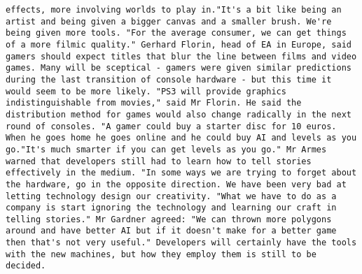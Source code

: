 \documentclass[11pt]{article}
\begin{document}
\begin{Verbatim}[commandchars=\\\{\}]
effects, more involving worlds to play in."It's a bit like being an artist and being given a bigger canvas and a smaller brush. We're being given more tools. "For the average consumer, we can get things of a more filmic quality." Gerhard Florin, head of EA in Europe, said gamers should expect titles that blur the line between films and video games. Many will be sceptical - gamers were given similar predictions during the last transition of console hardware - but this time it would seem to be more likely. "PS3 will provide graphics indistinguishable from movies," said Mr Florin. He said the distribution method for games would also change radically in the next round of consoles. "A gamer could buy a starter disc for 10 euros. When he goes home he goes online and he could buy AI and levels as you go."It's much smarter if you can get levels as you go." Mr Armes warned that developers still had to learn how to tell stories effectively in the medium. "In some ways we are trying to forget about the hardware, go in the opposite direction. We have been very bad at letting technology design our creativity. "What we have to do as a company is start ignoring the technology and learning our craft in telling stories." Mr Gardner agreed: "We can thrown more polygons around and have better AI but if it doesn't make for a better game then that's not very useful." Developers will certainly have the tools with the new machines, but how they employ them is still to be decided.                                                                                                                                                                                                                                                                                                                                                       

\end{Verbatim}
\end{document}
